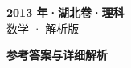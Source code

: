 \documentclass[zihao=-4, a4paper]{ctexart}
\begin{document}
\begin{center}
  {\Large\bfseries 2013 年·湖北卷·理科}\\[4pt]
  {\large 数学 · 解析版}
\end{center}
\medskip
{}

\clearpage
{}
\begin{center}{\Large\bfseries 参考答案与详细解析}\end{center}
\medskip

\end{document}
